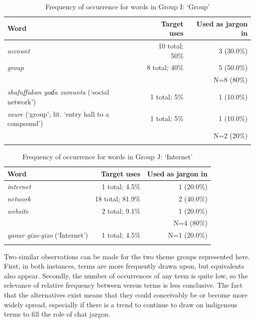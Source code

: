 \documentclass[output=paper
,newtxmath
,modfonts
,nonflat]{langsci/langscibook}
\begin{document}
\begin{table}
\begin{tabularx}{\textwidth}{Qrr}
\lsptoprule
Word & Target uses & Used as jargon in \\
\midrule
\textit{account} & 10 total; 50\% & 3 (30.0\%)\\
\textit{group}   & 8 total; 40\% & 5 (50.0\%)\\\midrule
& & N=8 (80\%)\\\midrule
\textit{shafuffukan yaɗa zumunta} (‘social network’)      & 1 total; 5\% & 1 (10.0\%)\\
\textit{zaure} (‘group’; lit. ‘entry hall to a compound’) & 1 total; 5\% & 1 (10.0\%)\\\midrule
& & N=2 (20\%)\\
\lspbottomrule
\end{tabularx}
\caption{Frequency of occurrence for words in Group I: ‘Group’}
\label{tab:purvis:11}
\end{table} 

\begin{table}
\begin{tabularx}{\textwidth}{Qrr}
\lsptoprule
Word &  Target uses & Used as jargon in \\
\midrule
\textit{internet} & 1 total; 4.5\% & 1 (20.0\%)\\
\textit{network}  & 18 total; 81.9\% & 2 (40.0\%)\\
\textit{website}  & 2 total; 9.1\% & 1 (20.0\%)\\\midrule
& & N=4 (80\%)\\\midrule
\textit{yanar gizo-gizo} (‘Internet’) & 1 total; 4.5\% & N=1 (20.0\%)\\
\lspbottomrule
\end{tabularx}
\caption{Frequency of occurrence for words in Group J: ‘Internet’}
\label{tab:purvis:12}
\end{table} 

Two similar observations can be made for the two theme groups represented here. First, in both instances,  terms are more frequently drawn upon, but  equivalents also appear. Secondly, the number of occurrences of any term is quite low, so the relevance of relative frequency between  versus  terms is less conclusive. The fact that the  alternatives exist means that they could conceivably be or become more widely spread, especially if there is a trend to continue to draw on indigenous terms to fill the role of chat jargon. 
\end{document}
